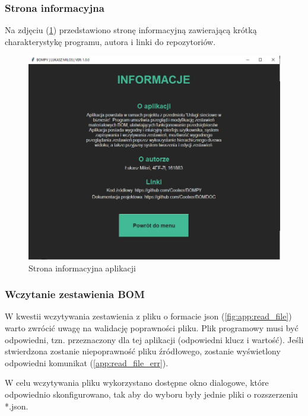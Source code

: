\documentclass[12pt,twoside]{article}
\begin{document}
\subsubsection*{Strona informacyjna}

Na zdjęciu (\ref{fig:app:info}) przedstawiono stronę informacyjną zawierającą krótką charakterystykę programu, autora i linki do repozytoriów.
\begin{figure}[ht]
	\centering
	\includegraphics[width=\textwidth]{figures/app/info.jpg}
	\caption{Strona informacyjna aplikacji}
\label{fig:app:info}
\end{figure}

\subsubsection*{Wczytanie zestawienia BOM}

W kwestii wczytywania zestawienia z pliku o formacie json (\ref{fig:app:read_file}) warto zwrócić uwagę na walidację poprawności pliku. Plik programowy musi być odpowiedni, tzn. przeznaczony dla tej aplikacji (odpowiedni klucz i wartość). Jeśli stwierdzona zostanie niepoprawność pliku źródłowego, zostanie wyświetlony odpowiedni komunikat (\ref{app:read_file_err}).

W celu wczytywania pliku wykorzystano dostępne okno dialogowe, które odpowiednio skonfigurowano, tak aby do wyboru były jednie pliki o rozszerzeniu *.json.
\end{document}
